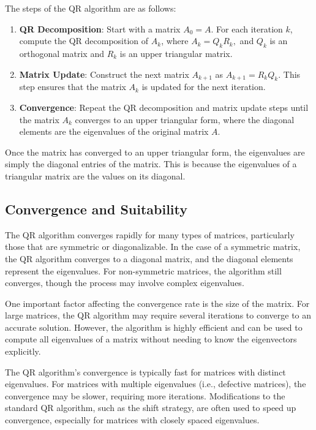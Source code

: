 \documentclass[journal]{IEEEtran}
\begin{document}
The steps of the QR algorithm are as follows:

\begin{enumerate}
    \item \textbf{QR Decomposition}: Start with a matrix $A_0 = A$. For each iteration $k$, compute the QR decomposition of $A_k$, where
    $
    A_k = Q_k R_k,
    $
    and $Q_k$ is an orthogonal matrix and $R_k$ is an upper triangular matrix.
    
    \item \textbf{Matrix Update}: Construct the next matrix $A_{k+1}$ as
    $
    A_{k+1} = R_k Q_k.
    $
    This step ensures that the matrix $A_k$ is updated for the next iteration.

    \item \textbf{Convergence}: Repeat the QR decomposition and matrix update steps until the matrix $A_k$ converges to an upper triangular form, where the diagonal elements are the eigenvalues of the original matrix $A$.

\end{enumerate}

Once the matrix has converged to an upper triangular form, the eigenvalues are simply the diagonal entries of the matrix. This is because the eigenvalues of a triangular matrix are the values on its diagonal.

\subsection{Convergence and Suitability}
The QR algorithm converges rapidly for many types of matrices, particularly those that are symmetric or diagonalizable. In the case of a symmetric matrix, the QR algorithm converges to a diagonal matrix, and the diagonal elements represent the eigenvalues. For non-symmetric matrices, the algorithm still converges, though the process may involve complex eigenvalues.

One important factor affecting the convergence rate is the size of the matrix. For large matrices, the QR algorithm may require several iterations to converge to an accurate solution. However, the algorithm is highly efficient and can be used to compute all eigenvalues of a matrix without needing to know the eigenvectors explicitly.

The QR algorithm's convergence is typically fast for matrices with distinct eigenvalues. For matrices with multiple eigenvalues (i.e., defective matrices), the convergence may be slower, requiring more iterations. Modifications to the standard QR algorithm, such as the shift strategy, are often used to speed up convergence, especially for matrices with closely spaced eigenvalues.
\end{document}
